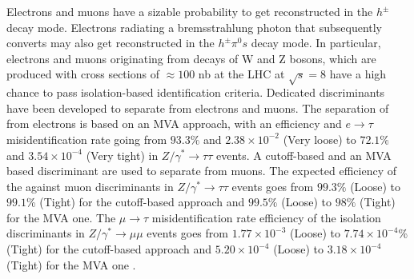 Electrons and muons have a sizable probability to get reconstructed in the \ensuremath{h^{\pm}} decay mode. Electrons radiating a bremsstrahlung photon that subsequently converts may also get reconstructed in the \ensuremath{h^{\pm}\pi^{0}s} decay mode. In particular, electrons and muons originating from decays of W and Z bosons, which are produced with cross sections of \ensuremath{\approx100} nb at the LHC at \ensuremath{\sqrt{s} = 8} \tev have a high chance to pass isolation-based \hadtau identification criteria. Dedicated discriminants have been developed to separate \hadtau from electrons and muons. The separation of \hadtau from electrons is based on an MVA approach, with an efficiency and \ensuremath{e\to \tau} misidentification rate going from \ensuremath{93.3\%} and \ensuremath{2.38 \times 10^{−2}} (Very loose) to \ensuremath{72.1\%} and \ensuremath{3.54 \times 10^{−4}} (Very tight) in \ensuremath{Z/\gamma^{*} \longrightarrow \tau\tau} events.
A cutoff-based and an MVA based discriminant are used to separate \hadtau from muons. The expected efficiency of the \hadtau against muon discriminants in \ensuremath{Z/\gamma^{*} \longrightarrow \tau\tau} events goes from \ensuremath{99.3\%} (Loose) to \ensuremath{99.1}\% (Tight) for the cutoff-based approach and \ensuremath{99.5\%} (Loose) to \ensuremath{98\%} (Tight) for the MVA one. The \ensuremath{\mu \to \tau} misidentification rate efficiency of the \hadtau isolation discriminants in \ensuremath{Z/\gamma^{*} \longrightarrow \mu\mu} events goes from \ensuremath{1.77 \times 10^{−3}} (Loose) to \ensuremath{7.74 \times 10^{−4}}\% (Tight) for the cutoff-based approach and \ensuremath{5.20 \times 10^{−4}} (Loose) to \ensuremath{3.18 \times 10^{−4}} (Tight) for the MVA one \cite{Khachatryan:2015dfa}.

\clearpage

